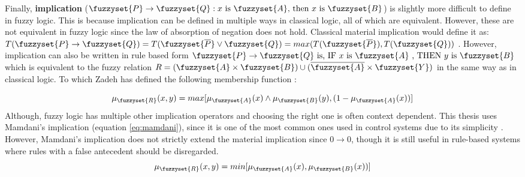 Finally, \textbf{implication}  ($\fuzzyset{P}\to \fuzzyset{Q}: x \text{ is } \fuzzyset{A} \text{, then }x \text{ is } \fuzzyset{B}$) is slightly more difficult to define in fuzzy logic. This is because implication can be defined in multiple ways in classical logic, all of which are equivalent. However, these are not equivalent in fuzzy logic since the law of absorption of negation does not hold. Classical material implication would  define it as: $T(\fuzzyset{P}\to \fuzzyset{Q})=T(\fuzzyset{\overline{P}}\lor\fuzzyset{Q})=max(T(\fuzzyset{\overline{P}}),T(\fuzzyset{Q}))$ \cite{oh1987properties}.
However, implication can also be written in rule based form  $\fuzzyset{P} \to \fuzzyset{Q} \text{ is,  IF } x \text{ is } \fuzzyset{A} \text{ , THEN } y \text{ is } \fuzzyset{B}$ which is equivalent to the fuzzy relation $R=(\fuzzyset{A}\times\fuzzyset{B})\cup (\overline{\fuzzyset{A}}\times \fuzzyset{Y})$ in the same way as in classical logic.
To which Zadeh has defined the following membership function \cite{oh1987properties}:

\begin{equation}
    \mu_{\fuzzyset{R}}(x,y)=max[\mu_{\fuzzyset{A}}(x)\land\mu_{\fuzzyset{B}}(y),(1-\mu_{\fuzzyset{A}}(x))]
    \label{eq:implication-orig}
\end{equation}
Although, fuzzy logic has multiple other implication operators and choosing the right one is often context dependent. This thesis uses Mamdani's implication (equation \ref{eq:mamdani}), since it is one of the most common ones used in control systems  due to its simplicity \cite{ross2009fuzzy}. However, Mamdani's implication does not strictly extend the material implication since $0 \to 0$, though it is still useful in rule-based systems where rules with a false antecedent should be disregarded.
\begin{equation}
    \mu_{\fuzzyset{R}}(x,y)=min[\mu_{\fuzzyset{A}}(x),\mu_{\fuzzyset{B}}(x))]
    \label{eq:mamdani}
\end{equation}


